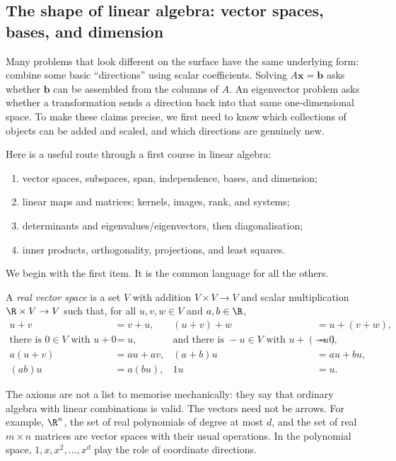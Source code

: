 
\subsection{The shape of linear algebra: vector spaces, bases, and dimension}

Many problems that look different on the surface have the same underlying form: combine some basic ``directions'' using scalar coefficients. Solving $A\mathbf{x}=\mathbf{b}$ asks whether $\mathbf{b}$ can be assembled from the columns of $A$. An eigenvector problem asks whether a transformation sends a direction back into that same one-dimensional space. To make these claims precise, we first need to know which collections of objects can be added and scaled, and which directions are genuinely new.

Here is a useful route through a first course in linear algebra:
\begin{enumerate}[label=\arabic*.]
  \item vector spaces, subspaces, span, independence, bases, and dimension;
  \item linear maps and matrices; kernels, images, rank, and systems;
  \item determinants and eigenvalues/eigenvectors, then diagonalisation;
  \item inner products, orthogonality, projections, and least squares.
\end{enumerate}
We begin with the first item. It is the common language for all the others.

\begin{definition}
A \emph{real vector space} is a set $V$ with addition $V\times V\to V$ and scalar multiplication $\R\times V\to V$ such that, for all $u,v,w\in V$ and $a,b\in\R$,
\begin{align*}
  u+v&=v+u, & (u+v)+w&=u+(v+w),\\
  \text{there is }0\in V\text{ with }u+0&=u, & \text{and there is }-u\in V\text{ with }u+(-u)&=0,\\
  a(u+v)&=au+av, &(a+b)u&=au+bu,\\
  (ab)u&=a(bu), &1u&=u.
\end{align*}
\end{definition}

The axioms are not a list to memorise mechanically: they say that ordinary algebra with linear combinations is valid. The vectors need not be arrows. For example, $\R^n$, the set of real polynomials of degree at most $d$, and the set of real $m\times n$ matrices are vector spaces with their usual operations. In the polynomial space, $1,x,x^2,\ldots,x^d$ play the role of coordinate directions.

